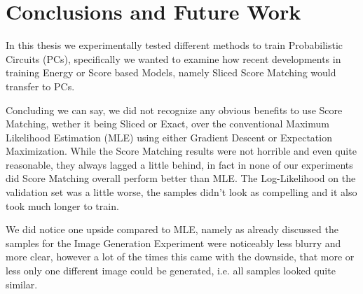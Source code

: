 \chapter{Conclusions and Future Work}
\label{cha:conclusions}

In this thesis we experimentally tested different methods to train Probabilistic Circuits (PCs), specifically
we wanted to examine how recent developments in training Energy or Score based Models, namely 
Sliced Score Matching would transfer to PCs. 

Concluding we can say, we did not recognize any obvious benefits to use Score Matching, wether it being Sliced 
or Exact, over the conventional Maximum Likelihood Estimation (MLE) using either Gradient Descent 
or Expectation Maximization. While the Score Matching results were not horrible and even quite reasonable, 
they always lagged a little behind, in fact in none of our 
experiments did Score Matching overall perform better than MLE. The Log-Likelihood on the validation set was 
a little worse, the samples didn't look as compelling and it also took much longer to train. 

We did notice one upside compared to MLE, namely as already discussed the samples for the Image Generation 
Experiment were noticeably less blurry and more clear, however a lot of the times this came with the downside,
that more or less only one different image could be generated, i.e. all samples looked quite similar. 
